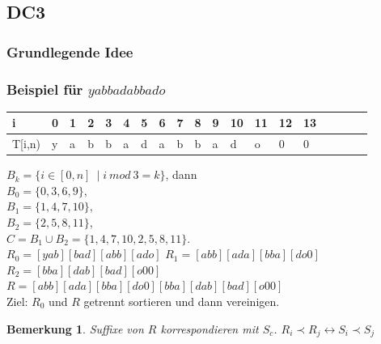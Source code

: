 \documentclass{beamer}
\newtheorem{remark}{Bemerkung}
\begin{document}
\subsection{DC3}

\begin{env}
\begin{frame}
\frametitle{Grundlegende Idee}
\begin{figure}
\begin{tikzpicture}

\end{tikzpicture}
\end{figure}
\end{frame}
\end{env}

\begin{frame}[fragile]
\frametitle{Beispiel für $yabbadabbado$}
\begin{table}
\begin{tabular}{l|l l l l l l l l l l l l l level}
    \toprule
    i & 0 & 1 & 2 & 3 & 4 & 5 & 6 & 7 & 8 & 9 & 10 & 11 & 12 & 13 \\
    \midrule
    T[i,n) & y & a & b & b & a & d & a & b & b & a & d & o & 0 & 0  \\
    \bottomrule
\end{tabular}
\end{table}
$B_k = \{ i \in [0,n]\ \mid i \: mod \: 3 = k \}$, dann \\
$B_0 = \{0, 3, 6, 9 \}$,                                \\
$B_1 = \{1, 4, 7, 10 \}$,                               \\
$B_2 = \{2, 5, 8, 11 \}$,                               \\
\medskip
$C   = B_1 \cup B_2 = \{1, 4, 7, 10, 2, 5, 8, 11\}$.    \\
\medskip
$R_0 = [yab][bad][abb][ado]$
$R_1 = [abb][ada][bba][do0]$                            \\
$R_2 = [bba][dab][bad][o00]$                            \\
\medskip
$R   = [abb][ada][bba][do0][bba][dab][bad][o00]$        \\
\medskip
Ziel: $R_0$ und $R$ getrennt sortieren und dann vereinigen.
\begin{remark}
Suffixe von $R$ korrespondieren mit $S_c$. $R_i \prec R_j \leftrightarrow S_i \prec S_j$
\end{remark}
\end{frame}
\end{document}

